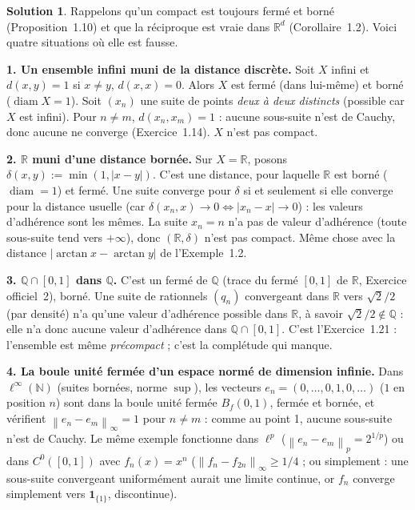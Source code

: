 \documentclass[11pt,a4paper]{article}
\newcommand{\R}{\mathbb{R}}
\newcommand{\N}{\mathbb{N}}
\newcommand{\Q}{\mathbb{Q}}
\newcommand{\diam}{\operatorname{diam}}
\newcommand{\Bf}{B_f}
\newcommand{\norm}[1]{\left\|#1\right\|}
\theoremstyle{definition}
\newtheorem*{solution}{Solution}
\begin{document}
\begin{solution}
Rappelons qu'un compact est toujours fermé et borné (Proposition~1.10) et que la réciproque est vraie dans $\R^d$ (Corollaire~1.2). Voici quatre situations où elle est fausse.

\medskip
\noindent\textbf{1. Un ensemble infini muni de la distance discrète.} Soit $X$ infini et $d(x,y)=1$ si $x\ne y$, $d(x,x)=0$. Alors $X$ est fermé (dans lui-même) et borné ($\diam X=1$). Soit $(x_n)$ une suite de points \emph{deux à deux distincts} (possible car $X$ est infini). Pour $n\ne m$, $d(x_n,x_m)=1$ : aucune sous-suite n'est de Cauchy, donc aucune ne converge (Exercice~1.14). $X$ n'est pas compact.

\medskip
\noindent\textbf{2. $\R$ muni d'une distance bornée.} Sur $X=\R$, posons $\delta(x,y):=\min(1,|x-y|)$. C'est une distance, pour laquelle $\R$ est borné ($\diam=1$) et fermé. Une suite converge pour $\delta$ si et seulement si elle converge pour la distance usuelle (car $\delta(x_n,x)\to0\iff|x_n-x|\to0$) : les valeurs d'adhérence sont les mêmes. La suite $x_n=n$ n'a pas de valeur d'adhérence (toute sous-suite tend vers $+\infty$), donc $(\R,\delta)$ n'est pas compact. Même chose avec la distance $|\arctan x-\arctan y|$ de l'Exemple~1.2.

\medskip
\noindent\textbf{3. $\Q\cap[0,1]$ dans $\Q$.} C'est un fermé de $\Q$ (trace du fermé $[0,1]$ de $\R$, Exercice officiel~2), borné. Une suite de rationnels $(q_n)$ convergeant dans $\R$ vers $\sqrt2/2$ (par densité) n'a qu'une valeur d'adhérence possible dans $\R$, à savoir $\sqrt2/2\notin\Q$ : elle n'a donc aucune valeur d'adhérence dans $\Q\cap[0,1]$. C'est l'Exercice~1.21 : l'ensemble est même \emph{précompact} ; c'est la complétude qui manque.

\medskip
\noindent\textbf{4. La boule unité fermée d'un espace normé de dimension infinie.} Dans $\ell^\infty(\N)$ (suites bornées, norme $\sup$), les vecteurs $e_n=(0,\dots,0,1,0,\dots)$ ($1$ en position $n$) sont dans la boule unité fermée $\Bf(0,1)$, fermée et bornée, et vérifient $\norm{e_n-e_m}_\infty=1$ pour $n\ne m$ : comme au point 1, aucune sous-suite n'est de Cauchy. Le même exemple fonctionne dans $\ell^p$ ($\norm{e_n-e_m}_p=2^{1/p}$) ou dans $C^0([0,1])$ avec $f_n(x)=x^n$ ($\norm{f_n-f_{2n}}_\infty\ge 1/4$ ; ou simplement : une sous-suite convergeant uniformément aurait une limite continue, or $f_n$ converge simplement vers $\mathbf 1_{\{1\}}$, discontinue).
\end{solution}
\end{document}
